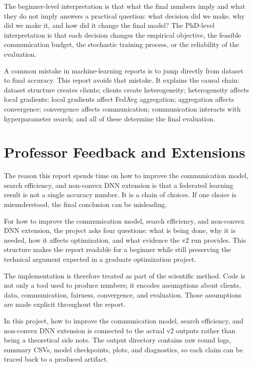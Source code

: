 \documentclass[11pt]{report}
\begin{document}
The beginner-level interpretation is that what the final numbers imply and what they do not imply
answers a practical question: what decision did we make, why did we make it, and how did it change
the final model? The PhD-level interpretation is that each decision changes the empirical objective,
the feasible communication budget, the stochastic training process, or the reliability of the
evaluation.

A common mistake in machine-learning reports is to jump directly from dataset to final accuracy.
This report avoids that mistake. It explains the causal chain: dataset structure creates clients;
clients create heterogeneity; heterogeneity affects local gradients; local gradients affect FedAvg
aggregation; aggregation affects convergence; convergence affects communication; communication
interacts with hyperparameter search; and all of these determine the final evaluation.

\chapter{Professor Feedback and Extensions}
The reason this report spends time on how to improve the communication model, search efficiency, and
non-convex DNN extension is that a federated learning result is not a single accuracy number. It is
a chain of choices. If one choice is misunderstood, the final conclusion can be misleading.

For how to improve the communication model, search efficiency, and non-convex DNN extension, the
project asks four questions: what is being done, why it is needed, how it affects optimization, and
what evidence the v2 run provides. This structure makes the report readable for a beginner while
still preserving the technical argument expected in a graduate optimization project.

The implementation is therefore treated as part of the scientific method. Code is not only a tool
used to produce numbers; it encodes assumptions about clients, data, communication, fairness,
convergence, and evaluation. Those assumptions are made explicit throughout the report.

In this project, how to improve the communication model, search efficiency, and non-convex DNN
extension is connected to the actual v2 outputs rather than being a theoretical side note. The
output directory contains raw round logs, summary CSVs, model checkpoints, plots, and diagnostics,
so each claim can be traced back to a produced artifact.
\end{document}

